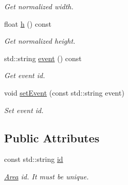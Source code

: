 \begin{DoxyCompactItemize}
\begin{DoxyCompactList}\small\item\em Get normalized width. \item\end{DoxyCompactList}\item 
\hypertarget{classArea_a5ded4f19da17d60d790bc43ba5506555}{
float \hyperlink{classArea_a5ded4f19da17d60d790bc43ba5506555}{h} () const }
\label{classArea_a5ded4f19da17d60d790bc43ba5506555}

\begin{DoxyCompactList}\small\item\em Get normalized height. \item\end{DoxyCompactList}\item 
\hypertarget{classArea_a0b441aa80aa564748f6bc3a48dc75239}{
std::string \hyperlink{classArea_a0b441aa80aa564748f6bc3a48dc75239}{event} () const }
\label{classArea_a0b441aa80aa564748f6bc3a48dc75239}

\begin{DoxyCompactList}\small\item\em Get event id. \item\end{DoxyCompactList}\item 
\hypertarget{classArea_a02457442589e06ff7f64c83a0609047c}{
void \hyperlink{classArea_a02457442589e06ff7f64c83a0609047c}{setEvent} (const std::string event)}
\label{classArea_a02457442589e06ff7f64c83a0609047c}

\begin{DoxyCompactList}\small\item\em Set event id. \item\end{DoxyCompactList}\end{DoxyCompactItemize}
\subsection*{Public Attributes}
\begin{DoxyCompactItemize}
\item 
\hypertarget{classArea_a88cf97626c8a7478211eda2255f87a0b}{
const std::string \hyperlink{classArea_a88cf97626c8a7478211eda2255f87a0b}{id}}
\label{classArea_a88cf97626c8a7478211eda2255f87a0b}

\begin{DoxyCompactList}\small\item\em \hyperlink{classArea}{Area} id. It must be unique. \item\end{DoxyCompactList}\end{DoxyCompactItemize}
